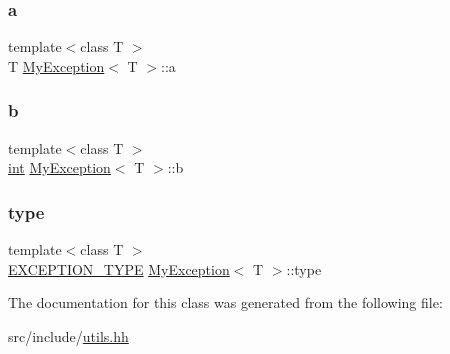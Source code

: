 \subsubsection{\texorpdfstring{a}{a}}
{\footnotesize\ttfamily template$<$class T $>$ \\
T \mbox{\hyperlink{class_my_exception}{My\+Exception}}$<$ T $>$\+::a}

\mbox{\label{class_my_exception_a42f4256beeac79f7ad8ad9682a9b83ee}} 
\subsubsection{\texorpdfstring{b}{b}}
{\footnotesize\ttfamily template$<$class T $>$ \\
\mbox{\hyperlink{draw_8hh_aa620a13339ac3a1177c86edc549fda9b}{int}} \mbox{\hyperlink{class_my_exception}{My\+Exception}}$<$ T $>$\+::b}

\mbox{\label{class_my_exception_a6a422c140340e945df9548f548ea0ed8}} 
\subsubsection{\texorpdfstring{type}{type}}
{\footnotesize\ttfamily template$<$class T $>$ \\
\mbox{\hyperlink{utils_8hh_af26a5d951fd6ab4b44e6cd8425aa0383}{E\+X\+C\+E\+P\+T\+I\+O\+N\+\_\+\+T\+Y\+PE}} \mbox{\hyperlink{class_my_exception}{My\+Exception}}$<$ T $>$\+::type}



The documentation for this class was generated from the following file\+:\begin{DoxyCompactItemize}
\item 
src/include/\mbox{\hyperlink{utils_8hh}{utils.\+hh}}\end{DoxyCompactItemize}
